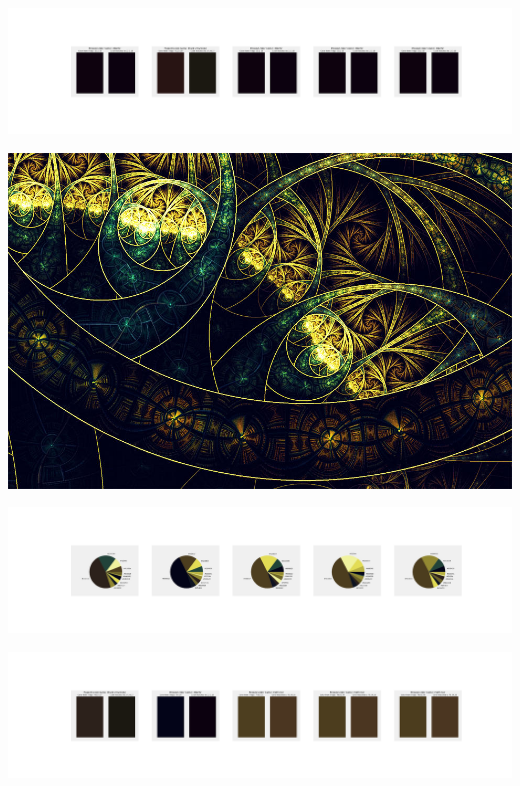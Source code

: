\documentclass[11pt]{article}
\begin{document}
\begin{landscape}
    \begin{center}
    \includegraphics[width=250mm]{./nbimg/peak-423.jpg}
    \end{center}
    

    \begin{center}
    \includegraphics[width=\textwidth]{./nbimg/file (75).jpg}
    \end{center}

    \begin{center}
    \includegraphics[width=250mm]{./nbimg/pie-424.jpg}
    \end{center}

    \begin{center}
    \includegraphics[width=250mm]{./nbimg/peak-424.jpg}
    \end{center}
    


\end{landscape}
\end{document}
